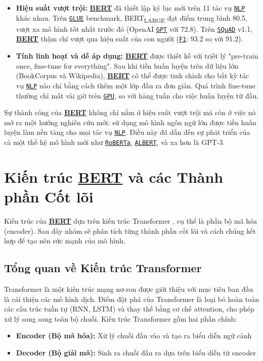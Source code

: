 \begin{itemize}
    \item \textbf{Hiệu suất vượt trội:} \hyperref[acro:bert]{\textbf{BERT}} đã thiết lập kỷ lục mới trên 11 tác vụ \hyperref[acro:nlp]{\texttt{NLP}} khác nhau.
    Trên \hyperref[acro:glue]{\texttt{GLUE}} benchmark, BERT\textsubscript{LARGE} đạt điểm trung bình 80.5, vượt xa mô hình tốt nhất trước đó (OpenAI \hyperref[acro:gpt]{\texttt{GPT}} với 72.8).
    Trên \hyperref[acro:squad]{\texttt{SQuAD}} v1.1, \hyperref[acro:bert]{\textbf{BERT}} thậm chí vượt qua hiệu suất của con người (\hyperref[acro:f1]{\texttt{F1}}: 93.2 so với 91.2).
    \item \textbf{Tính linh hoạt và dễ áp dụng:} \hyperref[acro:bert]{\textbf{BERT}} được thiết kế với triết lý "pre-train once, fine-tune for everything".
    Sau khi tiền huấn luyện trên dữ liệu lớn (BookCorpus và Wikipedia), \hyperref[acro:bert]{\textbf{BERT}} có thể được tinh chỉnh cho bất kỳ tác vụ \hyperref[acro:nlp]{\texttt{NLP}} nào chỉ bằng cách thêm một lớp đầu ra đơn giản.
    Quá trình fine-tune thường chỉ mất vài giờ trên \hyperref[acro:gpu]{\texttt{GPU}}, so với hàng tuần cho việc huấn luyện từ đầu.
\end{itemize}

Sự thành công của \hyperref[acro:bert]{\textbf{BERT}} không chỉ nằm ở hiệu suất vượt trội mà còn ở việc nó mở ra một hướng nghiên cứu mới: sử dụng mô hình ngôn ngữ lớn được tiền huấn luyện làm nền tảng cho mọi tác vụ \hyperref[acro:nlp]{\texttt{NLP}}.
Điều này đã dẫn đến sự phát triển của cả một thế hệ mô hình mới như \hyperref[acro:roberta]{\texttt{RoBERTa}}, \hyperref[acro:albert]{\texttt{ALBERT}}, và xa hơn là GPT-3.
\section{Kiến trúc \hyperref[acro:bert]{\textbf{BERT}} và các Thành phần Cốt lõi}
\label{sec:kien_truc_bert}
Kiến trúc của \hyperref[acro:bert]{\textbf{BERT}} dựa trên kiến trúc Transformer \cite{vaswani2017attention}, cụ thể là phần bộ mã hóa (encoder).
Sau đây nhóm sẽ phân tích từng thành phần cốt lõi và cách chúng kết hợp để tạo nên sức mạnh của mô hình.
\subsection{Tổng quan về Kiến trúc Transformer}
\label{ssec:tong_quan_transformer}
Transformer là một kiến trúc mạng nơ-ron được giới thiệu với mục tiêu ban đầu là cải thiện các mô hình dịch.
Điểm đột phá của Transformer là loại bỏ hoàn toàn các cấu trúc tuần tự (RNN, LSTM) và thay thế bằng cơ chế attention, cho phép xử lý song song toàn bộ chuỗi.
Kiến trúc Transformer gồm hai phần chính:
\begin{itemize}
    \item \textbf{Encoder (Bộ mã hóa):} Xử lý chuỗi đầu vào và tạo ra biểu diễn ngữ cảnh
    \item \textbf{Decoder (Bộ giải mã):} Sinh ra chuỗi đầu ra dựa trên biểu diễn từ encoder
\end{itemize}

